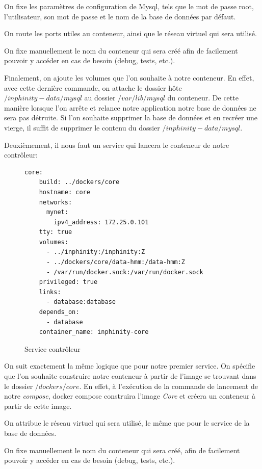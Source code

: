 On fixe les paramètres de configuration de Mysql, tels que le mot de passe root, l'utilisateur, son mot de passe et le nom de la base de données par défaut.

On route les ports utiles au conteneur, ainsi que le réseau virtuel qui sera utilisé.

On fixe manuellement le nom du conteneur qui sera créé afin de facilement pouvoir y accéder en cas de besoin (debug, tests, etc.).

Finalement, on ajoute les volumes que l'on souhaite à notre conteneur. En effet, avec cette dernière commande, on attache le dossier hôte \emph{$/inphinity-data/mysql$} au dossier \emph{$/var/lib/mysql$} du conteneur. De cette manière lorsque l'on arrête et relance notre application notre base de données ne sera pas détruite. Si l'on souhaite supprimer la base de données et en recréer une vierge, il suffit de supprimer le contenu du dossier \emph{$/inphinity-data/mysql$}.

Deuxièmement, il nous faut un service qui lancera le conteneur de notre contrôleur:

\begin{figure}[H] 
\centering 
\begin{lstlisting}[frame=single]
core:
    build: ../dockers/core
    hostname: core
    networks:
      mynet:
        ipv4_address: 172.25.0.101
    tty: true
    volumes:
      - ../inphinity:/inphinity:Z
      - ../dockers/core/data-hmm:/data-hmm:Z
      - /var/run/docker.sock:/var/run/docker.sock
    privileged: true
    links:
      - database:database
    depends_on:
      - database
    container_name: inphinity-core
\end{lstlisting}
\caption[Service contrôleur]{Service contrôleur}
\label{fig:serviceCore} 
\end{figure}

On suit exactement la même logique que pour notre premier service. On spécifie que l'on souhaite construire notre conteneur à partir de l'image se trouvant dans le dossier \emph{$/dockers/core$}. En effet, à l'exécution de la commande de lancement de notre \emph{compose}, docker compose construira l'image \emph{Core} et créera un conteneur à partir de cette image.

On attribue le réseau virtuel qui sera utilisé, le même que pour le service de la base de données.

On fixe manuellement le nom du conteneur qui sera créé, afin de facilement pouvoir y accéder en cas de besoin (debug, tests, etc.).

